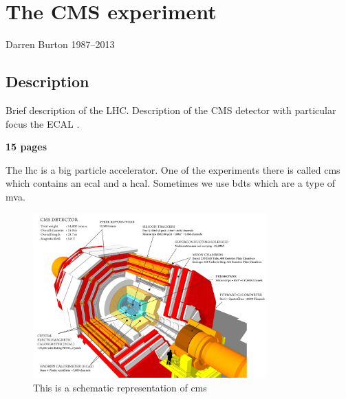 \chapter{The CMS experiment}
\label{chap:cms}
{Darren Burton 1987--2013}

\section{Description}

Brief description of the LHC. Description of the CMS detector with particular focus the ECAL .

\textbf{15 pages}

The \acf{lhc} is a big particle accelerator.
One of the experiments there is called \acf{cms} which contains an \acf{ecal} and a \acf{hcal}. Sometimes we use \acf{bdts} which are a type of \acf{mva}.

\begin{figure}
  \includegraphics[width=0.8\textwidth]{ch2_cms_exp/plots/cms_diagram.png}
  \caption[CMS diagram]{This is a schematic representation of \ac{cms}}
  \label{fig:cms_diagram}
\end{figure}
